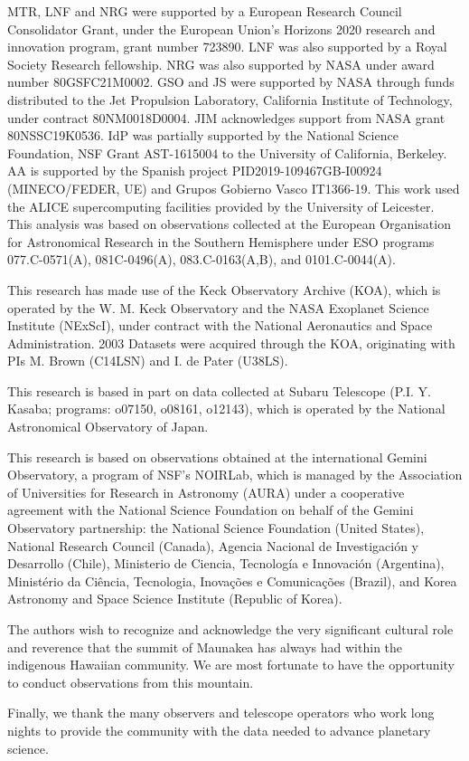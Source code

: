 \documentclass[twocolumn,10pt]{aastex631}
\begin{document}
\begin{acknowledgements}
MTR, LNF and NRG were supported by a European Research Council Consolidator Grant, under the European Union’s Horizons 2020 research and innovation program, grant number 723890. LNF was also supported by a Royal Society Research fellowship. NRG was also supported by NASA under award number 80GSFC21M0002. GSO and JS were supported by NASA through funds distributed to the Jet Propulsion Laboratory, California Institute of Technology, under contract 80NM0018D0004. JIM acknowledges support from NASA grant 80NSSC19K0536. IdP was partially supported by the National Science Foundation, NSF Grant AST-1615004 to the University of California, Berkeley. AA is supported by the Spanish project PID2019-109467GB-I00924 (MINECO/FEDER, UE) and Grupos Gobierno Vasco IT1366-19. 
This work used the ALICE supercomputing facilities provided by the University of Leicester. This analysis was based on observations collected at the European Organisation for Astronomical Research in the Southern Hemisphere under ESO programs 077.C-0571(A), 081C-0496(A), 083.C-0163(A,B), and 0101.C-0044(A).

This research has made use of the Keck Observatory Archive (KOA), which is operated by the W. M. Keck Observatory and the NASA Exoplanet Science Institute (NExScI), under contract with the National Aeronautics and Space Administration. 2003 Datasets were acquired through the KOA, originating with PIs M. Brown (C14LSN) and I. de Pater (U38LS).

This research is based in part on data collected at Subaru Telescope (P.I. Y. Kasaba; programs: o07150, o08161, o12143), which is operated by the National Astronomical Observatory of Japan. 

This research is based on observations obtained at the international Gemini Observatory, a program of NSF’s NOIRLab, which is managed by the Association of Universities for Research in Astronomy (AURA) under a cooperative agreement with the National Science Foundation on behalf of the Gemini Observatory partnership: the National Science Foundation (United States), National Research Council (Canada), Agencia Nacional de Investigaci\'{o}n y Desarrollo (Chile), Ministerio de Ciencia, Tecnolog\'{i}a e Innovaci\'{o}n (Argentina), Minist\'{e}rio da Ci\^{e}ncia, Tecnologia, Inova\c{c}\~{o}es e Comunica\c{c}\~{o}es (Brazil), and Korea Astronomy and Space Science Institute (Republic of Korea).

The authors wish to recognize and acknowledge the very significant cultural role and reverence that the summit of Maunakea has always had within the indigenous Hawaiian community.  We are most fortunate to have the opportunity to conduct observations from this mountain.

Finally, we thank the many observers and telescope operators who work long nights to provide the community with the data needed to advance planetary science.

\end{acknowledgements}
\end{document}
